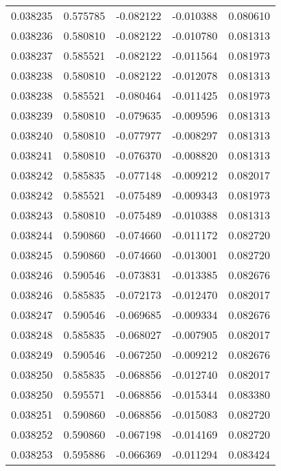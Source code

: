 \begin{tabular}{lrrrr}
0.038235    &  0.575785 & -0.082122 & -0.010388 &             0.080610 \\
0.038236    &  0.580810 & -0.082122 & -0.010780 &             0.081313 \\
0.038237    &  0.585521 & -0.082122 & -0.011564 &             0.081973 \\
0.038238    &  0.580810 & -0.082122 & -0.012078 &             0.081313 \\
0.038238    &  0.585521 & -0.080464 & -0.011425 &             0.081973 \\
0.038239    &  0.580810 & -0.079635 & -0.009596 &             0.081313 \\
0.038240    &  0.580810 & -0.077977 & -0.008297 &             0.081313 \\
0.038241    &  0.580810 & -0.076370 & -0.008820 &             0.081313 \\
0.038242    &  0.585835 & -0.077148 & -0.009212 &             0.082017 \\
0.038242    &  0.585521 & -0.075489 & -0.009343 &             0.081973 \\
0.038243    &  0.580810 & -0.075489 & -0.010388 &             0.081313 \\
0.038244    &  0.590860 & -0.074660 & -0.011172 &             0.082720 \\
0.038245    &  0.590860 & -0.074660 & -0.013001 &             0.082720 \\
0.038246    &  0.590546 & -0.073831 & -0.013385 &             0.082676 \\
0.038246    &  0.585835 & -0.072173 & -0.012470 &             0.082017 \\
0.038247    &  0.590546 & -0.069685 & -0.009334 &             0.082676 \\
0.038248    &  0.585835 & -0.068027 & -0.007905 &             0.082017 \\
0.038249    &  0.590546 & -0.067250 & -0.009212 &             0.082676 \\
0.038250    &  0.585835 & -0.068856 & -0.012740 &             0.082017 \\
0.038250    &  0.595571 & -0.068856 & -0.015344 &             0.083380 \\
0.038251    &  0.590860 & -0.068856 & -0.015083 &             0.082720 \\
0.038252    &  0.590860 & -0.067198 & -0.014169 &             0.082720 \\
0.038253    &  0.595886 & -0.066369 & -0.011294 &             0.083424 \\

\end{tabular}
